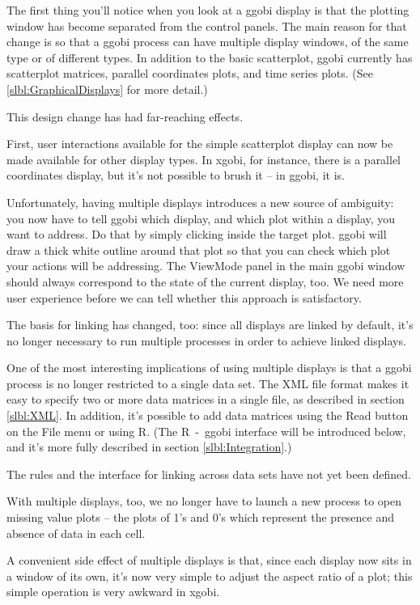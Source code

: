 \documentclass[11pt]{article}
\begin{document}
The first thing you'll notice when you look at a ggobi display is
that the plotting window has become separated from the control
panels.  The main reason for that change is so that a ggobi process
can have multiple display windows, of the same type or of different
types.  In addition to the basic scatterplot, ggobi currently has
scatterplot matrices, parallel coordinates plots, and time series
plots.  (See \ref{slbl:GraphicalDisplays} for more detail.)

This design change has had far-reaching effects.

First, user interactions available for the simple scatterplot display
can now be made available for other display types.  In xgobi, for
instance, there is a parallel coordinates display, but it's not
possible to brush it -- in ggobi, it is. 

Unfortunately, having multiple displays introduces a new source of
ambiguity: you now have to tell ggobi which display, and which plot
within a display, you want to address.  Do that by simply clicking
inside the target plot.  ggobi will draw a thick white outline around
that plot so that you can check which plot your actions will be
addressing.  The ViewMode panel in the main ggobi window should
always correspond to the state of the current display, too.  We need
more user experience before we can tell whether this approach is
satisfactory.

The basis for linking has changed, too:  since all displays are
linked by default, it's no longer necessary to run multiple processes
in order to achieve linked displays.

One of the most interesting implications of using multiple displays
is that a ggobi process is no longer restricted to a single data
set.  The XML file format makes it easy to specify two or more data
matrices in a single file, as described in section \ref{slbl:XML}.
In addition, it's possible to add data matrices using the Read button
on the File menu or using R.  (The R~-~ggobi interface will be
introduced below, and it's more fully described in section
\ref{slbl:Integration}.)

The rules and the interface for linking across data sets have not yet
been defined.

With multiple displays, too, we no longer have to launch a new
process to open missing value plots -- the plots of 1's and 0's
which represent the presence and absence of data in each cell.

A convenient side effect of multiple displays is that, since each
display now sits in a window of its own, it's now very simple to
adjust the aspect ratio of a plot; this simple operation is very
awkward in xgobi.
\end{document}

